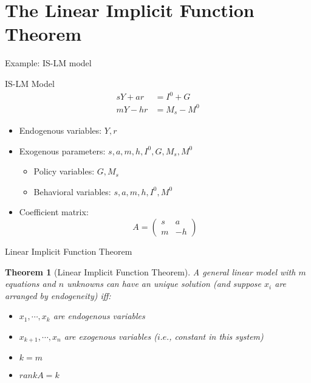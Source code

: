 \documentclass[a4paper,11pt]{article}
\newtheorem{thm}{Theorem}
\begin{document}
\section{The Linear Implicit Function Theorem} %
\label{sec:the_linear_implicit_function_theorem}
\begin{frame}[t]{Example: IS-LM model}
	\begin{block}
		{IS-LM Model}
		\begin{align*}
			sY + ar &= I^0 + G \tag{IS}\\
			mY - hr &= M_s - M^0 \tag{LM} 
		\end{align*}
	\end{block}
	\begin{itemize}
		\item Endogenous variables: $Y,r$
		\item Exogenous parameters: $s,a,m,h,I^0,G,M_s,M^0$
		\begin{itemize}
			\item Policy variables: $G,M_s$
			\item Behavioral variables: $s,a,m,h,I^0,M^0$
		\end{itemize}
		\item Coefficient matrix:
		\[
			A=\begin{pmatrix}
				s&a\\m&-h
			\end{pmatrix}
		\]
	\end{itemize}
\end{frame}
\begin{frame}[t]{Linear Implicit Function Theorem}
	\begin{thm}
		[Linear Implicit Function Theorem]
		A general linear model with $m$ equations and $n$ unknowns can have an unique solution (and suppose $x_i$ are arranged by endogeneity) iff:
		\begin{itemize}
			\item $x_1,\cdots,x_k$ are endogenous variables
			\item $x_{k+1},\cdots, x_n$ are exogenous variables ($i.e.$, constant in this system)
			\item $k=m$
			\item $rank A = k$
		\end{itemize}
	\end{thm}
\end{frame}
\end{document}

